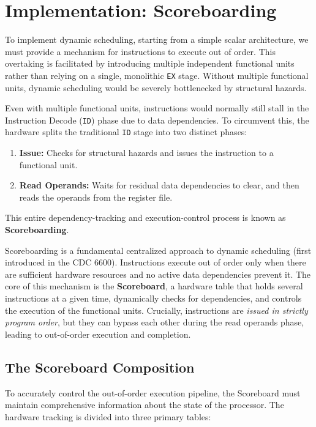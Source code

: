 \section{Implementation: Scoreboarding}

To implement dynamic scheduling, starting from a simple scalar architecture, we must provide a mechanism for instructions to execute out of order. This overtaking is facilitated by introducing multiple independent functional units rather than relying on a single, monolithic \texttt{EX} stage. Without multiple functional units, dynamic scheduling would be severely bottlenecked by structural hazards. 

Even with multiple functional units, instructions would normally still stall in the Instruction Decode (\texttt{ID}) phase due to data dependencies. To circumvent this, the hardware splits the traditional \texttt{ID} stage into two distinct phases: 
\begin{enumerate}
    \item \textbf{Issue:} Checks for structural hazards and issues the instruction to a functional unit.
    \item \textbf{Read Operands:} Waits for residual data dependencies to clear, and then reads the operands from the register file.
\end{enumerate}

This entire dependency-tracking and execution-control process is known as \textbf{Scoreboarding}.

Scoreboarding is a fundamental centralized approach to dynamic scheduling (first introduced in the CDC 6600). Instructions execute out of order only when there are sufficient hardware resources and no active data dependencies prevent it. The core of this mechanism is the \textbf{Scoreboard}, a hardware table that holds several instructions at a given time, dynamically checks for dependencies, and controls the execution of the functional units. Crucially, instructions are \textit{issued in strictly program order}, but they can bypass each other during the read operands phase, leading to out-of-order execution and completion.

\subsection{The Scoreboard Composition}

To accurately control the out-of-order execution pipeline, the Scoreboard must maintain comprehensive information about the state of the processor. The hardware tracking is divided into three primary tables:

